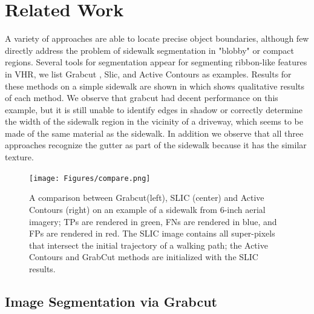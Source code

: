 \chapter{Related Work}

A variety of approaches are able to locate precise object boundaries, although few directly address the problem of sidewalk segmentation in "blobby" or compact regions. Several tools for segmentation appear for segmenting ribbon-like features in \ac{VHR}, we list Grabcut \cite{Rother2004-ou}, Slic\cite{Achanta:149300}, and Active Contours \cite{Kass88snakes:active} as examples.
Results for these methods on a simple sidewalk are shown in  which shows qualitative results of each method. We observe that grabcut had decent performance on this example, but it is still unable to identify edges in shadow or correctly determine the width of the sidewalk region in the vicinity of a driveway, which seems to be made of the same material as the sidewalk. In addition we observe that all three approaches recognize the gutter as part of the sidewalk because it has the similar texture.  
\begin{figure}[H]
    \centering
    \texttt{[image: Figures/compare.png]}
    \caption[Method comparison with Grabcut, Active Contours, and Slic]{
        A comparison between Grabcut(left), SLIC (center) and Active Contours (right) 
        on an example of a sidewalk from 6-inch aerial imagery; 
        \aclp{TP} are rendered in green, 
        \aclp{FN} are rendered in blue, and 
        \aclp{FP} are rendered in red.
        The SLIC image contains all super-pixels that intersect the initial trajectory of a walking path; the Active Contours and GrabCut methods are initialized with the SLIC results.
    }
    \label{fig:Method_comparison}
\end{figure}

\section{Image Segmentation via Grabcut} 

